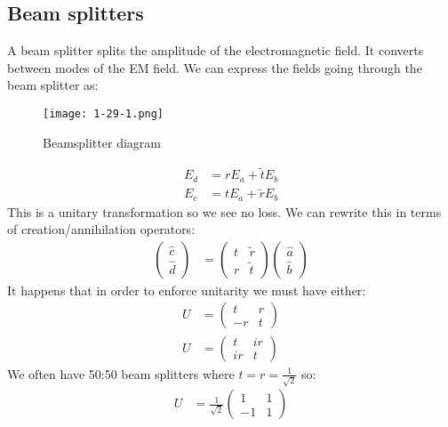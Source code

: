 \subsection{Beam splitters}
A beam splitter splits the amplitude of the electromagnetic field. It converts between modes of the EM field. We can express the fields going through the beam splitter as:
\begin{figure*}[h]
	\centering
	\texttt{[image: 1-29-1.png]}
	\caption*{Beamsplitter diagram}
\end{figure*}
\begin{align*}
	E_d &= rE_a + \tilde{t} E_b \\
	E_c &= tE_a + \tilde{r}E_b
\end{align*}
This is a unitary transformation so we see no loss. We can rewrite this in terms of creation/annihilation operators:
\begin{align*}
	\begin{pmatrix}
		\hat{c} \\
		\hat{d}
	\end{pmatrix} &= \begin{pmatrix}
	t & \tilde{r} \\
	r & \tilde{t}
		 \end{pmatrix}
		 \begin{pmatrix}
			 \hat{a} \\
			 \hat{b}
		 \end{pmatrix}
\end{align*}
It happens that in order to enforce unitarity we must have either:
\begin{align*}
	U &= \begin{pmatrix}
		t & r \\
		-r & t
	     \end{pmatrix} \\
	U &= \begin{pmatrix}
		t & ir \\
		ir & t
	     \end{pmatrix}
\end{align*}
We often have 50:50 beam splitters where $t=r=\frac{1}{\sqrt{2}}$ so:
\begin{align*}
	U &= \frac{1}{\sqrt{2}} \begin{pmatrix}
		1 & 1 \\
		-1 & 1
				\end{pmatrix}
\end{align*}
